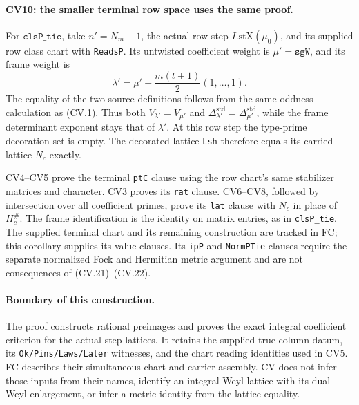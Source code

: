 \paragraph{CV10: the smaller terminal row space uses the same proof.}
For \(\texttt{clsP\_tie}\), take \(n'=N_m-1\), the actual
row step \(I.\mathrm{stX}(\mu_0)\), and its supplied row
class chart with \texttt{ReadsP}. Its untwisted coefficient
weight is \(\mu'=\texttt{sgW}\), and its frame weight is
\[
                  \lambda'=\mu'-\frac{m(t+1)}2(1,\ldots,1).
                                                               \tag{CV.23}
\]
The equality of the two source definitions follows from
the same oddness calculation as (CV.1). Thus both
\(V_{\lambda'}=V_{\mu'}\) and
\(\Delta_{\lambda'}^{\mathrm{std}}
 =\Delta_{\mu'}^{\mathrm{std}}\), while the frame
determinant exponent stays that of \(\lambda'\).
At this row step the type-prime decoration set is empty.
The decorated lattice \texttt{Lsh} therefore equals its
carried lattice \(N_c\) exactly.

CV4--CV5 prove the terminal \texttt{ptC} clause using the
row chart's same stabilizer matrices and character.
CV3 proves its \texttt{rat} clause.
CV6--CV8, followed by intersection over all coefficient
primes, prove its \texttt{lat} clause with \(N_c\) in place
of \(H_c^\#\). The frame identification is the identity
on matrix entries, as in \texttt{clsP\_tie}.
The supplied terminal chart and its remaining construction are tracked in FC; this
corollary supplies its value clauses. Its
\texttt{ipP} and \texttt{NormPTie} clauses require the
separate normalized Fock and Hermitian metric argument
and are not consequences of (CV.21)--(CV.22).

\paragraph{Boundary of this construction.}
The proof constructs rational preimages and proves the
exact integral coefficient criterion for the actual
step lattices. It retains the supplied true column datum,
its \texttt{Ok/Pins/Laws/Later} witnesses, and the chart
reading identities used in CV5. FC describes their
simultaneous chart and carrier assembly. CV does not
infer those inputs from their names, identify an
integral Weyl lattice with its dual-Weyl enlargement,
or infer a metric identity from the lattice equality.
